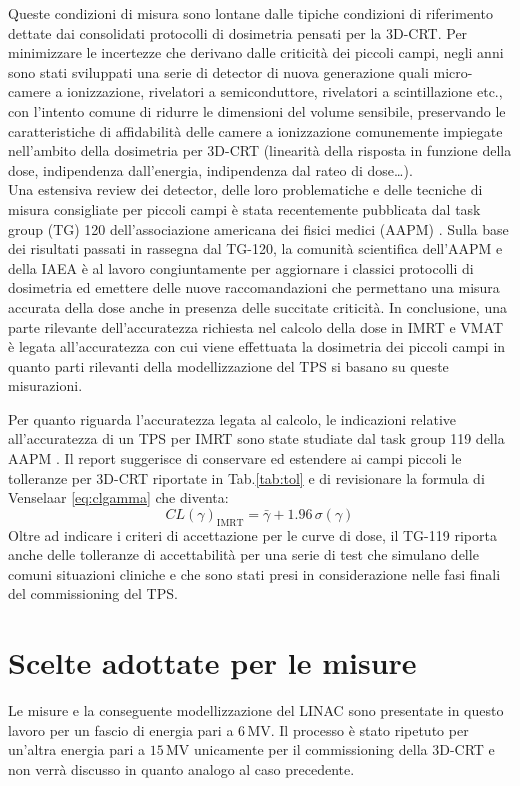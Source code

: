 Queste condizioni di misura sono lontane dalle tipiche condizioni di riferimento dettate dai consolidati protocolli di dosimetria \cite{Almond1999,Andreo2006} pensati per la 3D-CRT. Per minimizzare le incertezze che derivano dalle criticità dei piccoli campi, negli anni sono stati sviluppati una serie di detector di nuova generazione quali micro-camere a ionizzazione, rivelatori a semiconduttore, rivelatori a scintillazione etc., con l'intento comune di ridurre le dimensioni del volume sensibile, preservando le caratteristiche di affidabilità delle camere a ionizzazione comunemente impiegate nell'ambito della dosimetria per 3D-CRT (linearità della risposta in funzione della dose, indipendenza dall'energia, indipendenza dal rateo di dose\ldots).\\
Una estensiva review dei detector, delle loro problematiche e delle tecniche di misura consigliate per piccoli campi è stata recentemente pubblicata dal task group (TG) 120 dell'associazione americana dei fisici medici (AAPM) \cite{Low2011}. Sulla base dei risultati passati in rassegna dal TG-120, la comunità scientifica dell'AAPM e della IAEA è al lavoro congiuntamente per aggiornare i classici protocolli di dosimetria ed emettere delle nuove raccomandazioni che permettano una misura accurata della dose anche in presenza delle succitate criticità. In conclusione, una parte rilevante dell'accuratezza richiesta nel calcolo della dose in IMRT e VMAT è legata all'accuratezza con cui viene effettuata la dosimetria dei piccoli campi in quanto parti rilevanti della modellizzazione del TPS si basano su queste misurazioni.

Per quanto riguarda l'accuratezza legata al calcolo, le indicazioni relative all'accuratezza di un TPS per IMRT sono state studiate dal task group 119 della AAPM \cite{Ezzell2009}. Il report suggerisce di conservare ed estendere ai campi piccoli le tolleranze per 3D-CRT riportate in Tab.\ref{tab:tol} e di revisionare la formula di Venselaar \eqref{eq:clgamma} che diventa:
\begin{equation}
CL(\gamma)_{\text{IMRT}} = \bar{\gamma} + 1.96\,\sigma(\gamma)
\end{equation}
Oltre ad indicare i criteri di accettazione per le curve di dose, il TG-119 riporta anche delle tolleranze di accettabilità per una serie di test che simulano delle comuni situazioni cliniche e che sono stati presi in considerazione nelle fasi finali del commissioning del TPS. 

\section[Scelte adottate per le misure]{Scelte adottate per le misure}
Le misure e la conseguente modellizzazione del LINAC sono presentate in questo lavoro per un fascio di energia pari a $6\,$MV. Il processo è stato ripetuto per un'altra energia pari a $15\,$MV unicamente per il commissioning della 3D-CRT e non verrà discusso in quanto analogo al caso precedente.

